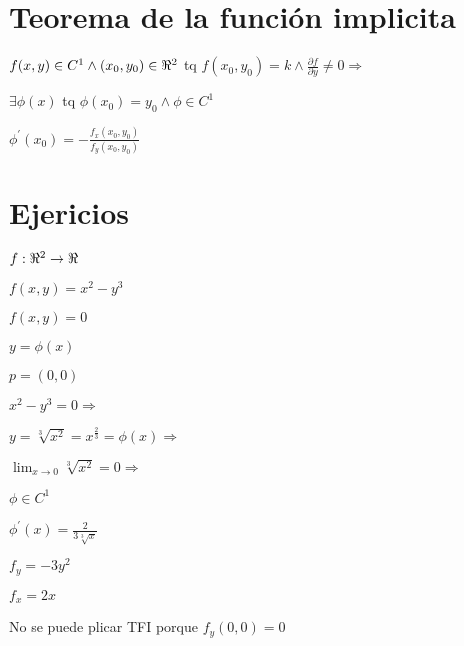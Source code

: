 \documentclass[../practica_04.tex]{subfiles}
\begin{document}
    \section*{Teorema de la función implicita}

    $ f(x,y) \in C^1 \wedge (x_0,y_0) \in \real^2 $ tq $ f(x_0,y_0)=k \wedge \frac{\partial f}{\partial y} \neq 0 \Rightarrow $

    $ \exists \phi(x) $ tq $ \phi(x_0) = y_0 \wedge \phi \in C^1$

    $ \phi^\prime(x_0) = -\frac{f_x(x_0,y_0)}{f_y(x_0,y_0)} $

    \section*{Ejericios}

    $ f: \real^2 \to \real $

    $ f(x,y) = x^2 - y^3 $

    $ f(x,y) = 0 $

    $ y = \phi(x) $

    $ p = (0,0) $

    $ x^2 - y^3 = 0 \Rightarrow $

    $ y = \sqrt[3]{x^2} = x^{\frac{2}{3}} = \phi(x) \Rightarrow $

    $ \lim_{x \to 0} \sqrt[3]{x^2} = 0 \Rightarrow $

    $ \phi \in C^1 $

    $ \phi^\prime(x) = \frac{2}{3\sqrt[3]{x}} $

    $ f_y = -3y^2 $

    $ f_x = 2x $

    No se puede plicar TFI porque $f_y(0,0) = 0$
\end{document}
